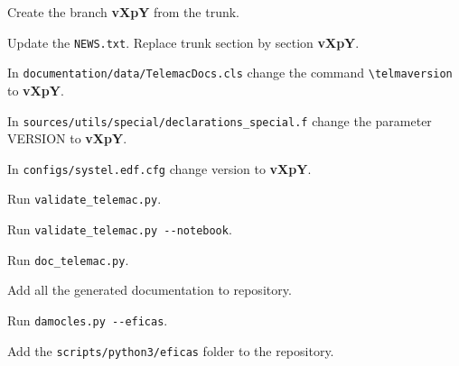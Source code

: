 \begin{todolist}
\setlength\itemsep{0.01em}
\item Create the branch \textbf{vXpY} from the trunk.
  \item Update the \verb!NEWS.txt!. Replace trunk section by section
    \textbf{vXpY}.
  \item In \verb!documentation/data/TelemacDocs.cls! change the command
    \verb!\telmaversion! to \textbf{vXpY}.
  \item In \verb!sources/utils/special/declarations_special.f! change the
    parameter VERSION to \textbf{vXpY}.
  \item In \verb!configs/systel.edf.cfg! change version to \textbf{vXpY}.
  \item Run \verb!validate_telemac.py!.
  \item Run \verb!validate_telemac.py --notebook!.
  \item Run \verb!doc_telemac.py!.
  \item Add all the generated documentation to repository.
  \item Run \verb!damocles.py --eficas!.
  \item Add the \verb!scripts/python3/eficas! folder to the repository.
\end{todolist}
